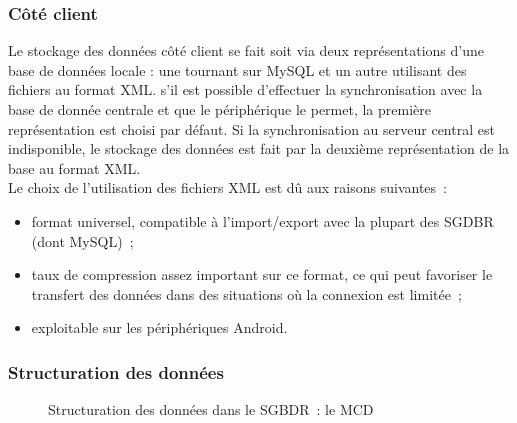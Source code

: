 \subsubsection{Côté client}
Le stockage des données côté client se fait soit via deux représentations d'une base de données locale : une tournant sur MySQL et un autre utilisant des fichiers au format XML. s'il est possible d'effectuer la synchronisation avec la base de donnée centrale et que le périphérique le permet, la première représentation est choisi par défaut. Si la synchronisation au serveur central est indisponible, le stockage des données est fait par la deuxième représentation de la base au format XML. \\
Le choix de l'utilisation des fichiers XML est dû aux raisons suivantes~:
\begin{itemize}
	\item format universel, compatible à l'import/export avec la plupart des SGDBR (dont MySQL)~;
	\item taux de compression assez important sur ce format, ce qui peut favoriser le transfert des données dans des situations où la connexion est limitée~;
	\item exploitable sur les périphériques Android.
\end{itemize}

\subsubsection{Structuration des données}
\begin{figure}[htbp]
	\centering
	\begin{MjMcd}
	\end{MjMcd}
	\caption{Structuration des données dans le SGBDR~: le MCD}
	\label{DonneesStructurationSgbdrMcd}
\end{figure}

